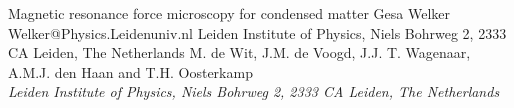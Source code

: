 \begin{conf-abstract}[]
{Magnetic resonance force microscopy for condensed matter}
{\color{blue} Gesa Welker}
{Welker@Physics.Leidenuniv.nl}
{Leiden Institute of Physics, Niels Bohrweg 2, 2333 CA Leiden, The Netherlands}
{{\color{blue}M. de Wit, J.M. de Voogd, J.J. T. Wagenaar, A.M.J. den Haan and T.H. Oosterkamp}\\ \textit{Leiden Institute of Physics, Niels Bohrweg 2, 2333 CA Leiden, The Netherlands}\\ 
\decofourleft \decofourright}





\printbibliography[heading=none]

\end{conf-abstract}
